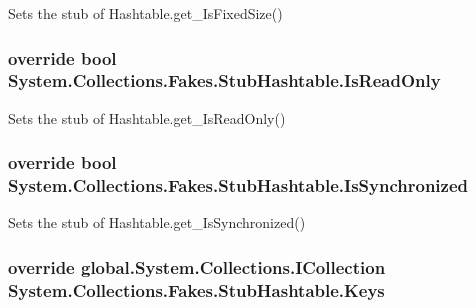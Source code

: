 Sets the stub of Hashtable.\-get\-\_\-\-Is\-Fixed\-Size()

\hypertarget{class_system_1_1_collections_1_1_fakes_1_1_stub_hashtable_ae8c44acecc8d36896dd0f8f50daf8176}{
\subsubsection[{Is\-Read\-Only}]{\setlength{\rightskip}{0pt plus 5cm}override bool System.\-Collections.\-Fakes.\-Stub\-Hashtable.\-Is\-Read\-Only\hspace{0.3cm}{\ttfamily [get]}}}\label{class_system_1_1_collections_1_1_fakes_1_1_stub_hashtable_ae8c44acecc8d36896dd0f8f50daf8176}


Sets the stub of Hashtable.\-get\-\_\-\-Is\-Read\-Only()

\hypertarget{class_system_1_1_collections_1_1_fakes_1_1_stub_hashtable_a66fc08dcd58d518d29afe431afc816e4}{
\subsubsection[{Is\-Synchronized}]{\setlength{\rightskip}{0pt plus 5cm}override bool System.\-Collections.\-Fakes.\-Stub\-Hashtable.\-Is\-Synchronized\hspace{0.3cm}{\ttfamily [get]}}}\label{class_system_1_1_collections_1_1_fakes_1_1_stub_hashtable_a66fc08dcd58d518d29afe431afc816e4}


Sets the stub of Hashtable.\-get\-\_\-\-Is\-Synchronized()

\hypertarget{class_system_1_1_collections_1_1_fakes_1_1_stub_hashtable_acd3d4b3e5ed38e8755bae5f3b9b9d1b7}{
\subsubsection[{Keys}]{\setlength{\rightskip}{0pt plus 5cm}override global.\-System.\-Collections.\-I\-Collection System.\-Collections.\-Fakes.\-Stub\-Hashtable.\-Keys\hspace{0.3cm}{\ttfamily [get]}}}\label{class_system_1_1_collections_1_1_fakes_1_1_stub_hashtable_acd3d4b3e5ed38e8755bae5f3b9b9d1b7}


